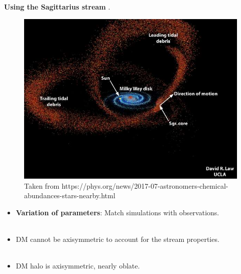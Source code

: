 \documentclass[xcolor=dvipsnames]{beamer}
\begin{document}
\begin{frame}

\textbf{Using the Sagittarius stream} \cite[Law \& Majewski 2010]{LawMajewski2010}.

\begin{figure}[c]
\includegraphics[width=0.6\linewidth]{./pics/Sagitarius.jpg}
\caption{\tiny Taken from https://phys.org/news/2017-07-astronomers-chemical-abundances-stars-nearby.html}
\end{figure}

\end{frame}


\begin{frame}

\centering
\small
\begin{itemize}

\item \textbf{Variation of parameters}: Match simulations with observations.\\~\\

\item DM cannot be axisymmetric to account for the stream properties.\\~\\

\item DM halo is axisymmetric, nearly oblate.

\end{itemize}

\end{frame}
\end{document}
